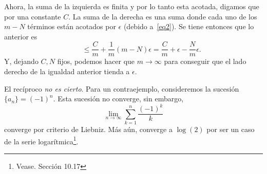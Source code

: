 \documentclass[fleqn,leqno,11pt,letterpaper,final]{article}
\begin{document}
Ahora, la suma de la izquierda es finita y por lo tanto esta acotada, digamos que por una
constante $C$. La suma de la derecha es una suma donde cada uno de los $m-N$ términos están
acotados por $\epsilon$ (debido a~\ref{eq2}). Se tiene entonces que lo anterior es
\[
	\phantom{(\ast)}\leq \frac{C}{m} + \frac{1}{m} (m-N)\epsilon
		= \frac{C}{m} + \epsilon- \frac{N}{m}\epsilon.
\]
Y, dejando $C,N$ fijos, podemos hacer que $m\to\infty$ para conseguir que
el lado derecho de la igualdad anterior tienda a $\epsilon$.

El recíproco \emph{no es cierto}. Para un contraejemplo, consideremos la sucesión
$\{ a_n \}=(-1)^n$. Esta sucesión no converge, sin embargo,
\[
	\lim_{n \to \infty} \sum_{k=1}^{n} \frac{(-1)^k}{k}  
\]
converge por criterio de Liebniz. Más aún, converge a $\log(2)$ por ser un caso
de la serie  logarítmica\footnote{Vease\cite{apostol_calculus._1980}. Sección 10.17}.


\printbibliography[
heading=bibintoc,
title={Referencias}
]
\end{document}
